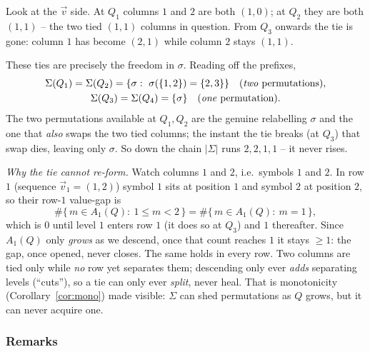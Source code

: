 Look at the $\vec v$ side.  At $Q_1$ columns $1$ and $2$ are both $(1,0)$; at $Q_2$
they are both $(1,1)$ -- the two tied $(1,1)$ columns in question.  From $Q_3$
onwards the tie is gone: column $1$ has become $(2,1)$ while column $2$ stays
$(1,1)$.

These ties are precisely the freedom in $\sigma$.  Reading off the prefixes,
\begin{gather*}
\Sigma(Q_1)=\Sigma(Q_2)=\{\sigma:\ \sigma(\{1,2\})=\{2,3\}\}\quad(\text{\emph{two}
permutations}),\\
\Sigma(Q_3)=\Sigma(Q_4)=\{\sigma\}\quad(\text{\emph{one} permutation}).
\end{gather*}
The two permutations available at $Q_1,Q_2$ are the genuine relabelling $\sigma$ and
the one that \emph{also} swaps the two tied columns; the instant the tie breaks (at
$Q_3$) that swap dies, leaving only $\sigma$.  So down the chain $|\Sigma|$ runs
$2,2,1,1$ -- it never rises.

\emph{Why the tie cannot re-form.}  Watch columns $1$ and $2$, i.e.\ symbols $1$ and
$2$.  In row $1$ (sequence $\vec v_1=(1,2)$) symbol $1$ sits at position $1$ and
symbol $2$ at position $2$, so their row-$1$ value-gap is
\[
\#\{\,m\in A_1(Q):\ 1\le m<2\,\}=\#\{\,m\in A_1(Q):\ m=1\,\},
\]
which is $0$ until level $1$ enters row $1$ (it does so at $Q_3$) and $1$ thereafter.
Since $A_1(Q)$ only \emph{grows} as we descend, once that count reaches $1$ it stays
$\ge1$: the gap, once opened, never closes.  The same holds in every row.  Two
columns are tied only while \emph{no} row yet separates them; descending only ever
\emph{adds} separating levels (``cuts''), so a tie can only ever \emph{split}, never
heal.  That is monotonicity (Corollary~\ref{cor:mono}) made visible: $\Sigma$ can
shed permutations as $Q$ grows, but it can never acquire one.

\subsubsection*{Remarks}

